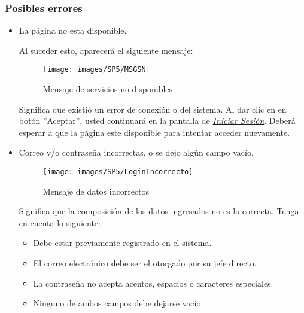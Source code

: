         \clearpage
        \subsubsection{Posibles errores}

            \begin{itemize}
                \item La página no esta disponible.

                    Al suceder esto, aparecerá el siguiente mensaje:
                    \begin{figure}[H]
                        \centering
                        \hypertarget{MSG25}{\texttt{[image: images/SP5/MSGSN]}}
                        \caption{Mensaje de servicios no disponibles}
                    \end{figure}

                    Significa que existió un error de conexión o del sistema. Al dar clic en en botón ''Aceptar'', usted continuará en la pantalla de \hyperlink{iniciarL}{\textit{Iniciar Sesión}}. Deberá esperar a que la página este disponible para intentar acceder nuevamente.

                \item Correo y/o contraseña incorrectas, o se dejo algún campo vacío.
                    \begin{figure}[H]
                        \centering
                        \hypertarget{MSG0}{\texttt{[image: images/SP5/LoginIncorrecto]}}
                        \caption{Mensaje de datos incorrectos}
                    \end{figure}

                Significa que la composición de los datos ingresados no es la correcta. Tenga en cuenta lo siguiente:

                            \begin{itemize}
                                \item Debe estar previamente registrado en el sistema.
                                \item El correo electrónico debe ser el otorgado por su jefe directo.
                                \item La contraseña no acepta acentos, espacios o caracteres especiales.
                                \item Ninguno de ambos campos debe dejarse vacío.
                            \end{itemize}

            \end{itemize}
